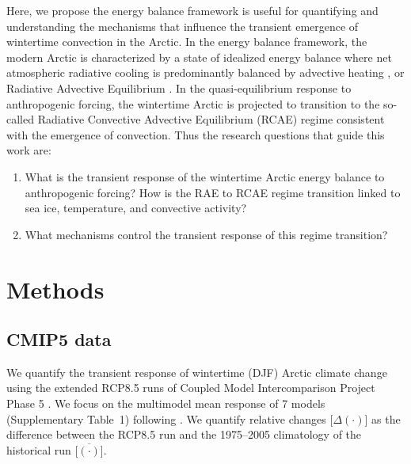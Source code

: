 \documentclass[draft]{agujournal2019}
\begin{document}
Here, we propose the energy balance framework is useful for quantifying and understanding the mechanisms that influence the transient emergence of wintertime convection in the Arctic. In the energy balance framework, the modern Arctic is characterized by a state of idealized energy balance where net atmospheric radiative cooling is predominantly balanced by advective heating \cite{nakamura1988}, or Radiative Advective Equilibrium \cite<RAE,>[]{cronin2016}. In the quasi-equilibrium response to anthropogenic forcing, the wintertime Arctic is projected to transition to the so-called Radiative Convective Advective Equilibrium (RCAE) regime \cite{miyawaki2022} consistent with the emergence of convection. Thus the research questions that guide this work are:
\begin{enumerate}
    \item What is the transient response of the wintertime Arctic energy balance to anthropogenic forcing? How is the RAE to RCAE regime transition linked to sea ice, temperature, and convective activity?
    \item What mechanisms control the transient response of this regime transition?
\end{enumerate}

\section{Methods}
\label{sec:met}
\subsection{CMIP5 data}
We quantify the transient response of wintertime (DJF) Arctic climate change using the extended RCP8.5 runs of Coupled Model Intercomparison Project Phase 5 \cite<CMIP5,>[]{meinshausen2011,taylor2012}. We focus on the multimodel mean response of 7 models (Supplementary Table~1) following . We quantify relative changes [$\Delta(\cdot)$] as the difference between the RCP8.5 run and the 1975--2005 climatology of the historical run [$\overline{(\cdot)}$].
\end{document}
